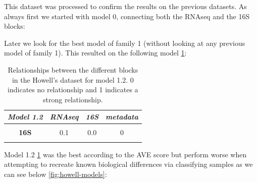 \documentclass[
  12pt,
  a4paper,
  twoside,
  openright]{book}
\begin{document}
This dataset was processed to confirm the results on the previous datasets.
As always first we started with model 0, connecting both the RNAseq and the 16S blocks:

Later we look for the best model of family 1 (without looking at any previous model of family 1).
This resulted on the following model \ref{tab:howell-model1-2}:

\begin{table}[H]

\caption[Model 1.2 of the Howell's dataset.]{\label{tab:howell-model1-2}Relationships between the different blocks in the Howell's dataset for model 1.2. 0 indicates no relationship and 1 indicates a strong relationship.}
\centering
\begin{tabular}[t]{|>{}c|c|c|>{}c|}
\hline
\em{\textbf{Model 1.2}} & \em{\textbf{RNAseq}} & \em{\textbf{16S}} & \em{\textbf{metadata}}\\
\hline
\textbf{\cellcolor{gray!6}{RNAseq}} & \cellcolor{gray!6}{0.0} & \cellcolor{gray!6}{0.1} & \cellcolor{gray!6}{1}\\
\hline
\textbf{16S} & 0.1 & 0.0 & 0\\
\hline
\textbf{\cellcolor{gray!6}{metadata}} & \cellcolor{gray!6}{1.0} & \cellcolor{gray!6}{0.0} & \cellcolor{gray!6}{0}\\
\hline
\end{tabular}
\end{table}

Model 1.2 \ref{tab:howell-model1-2} was the best according to the AVE score but perform worse when attempting to recreate known biological differences via classifying samples as we can see below \ref{fig:howell-models}:
\end{document}
